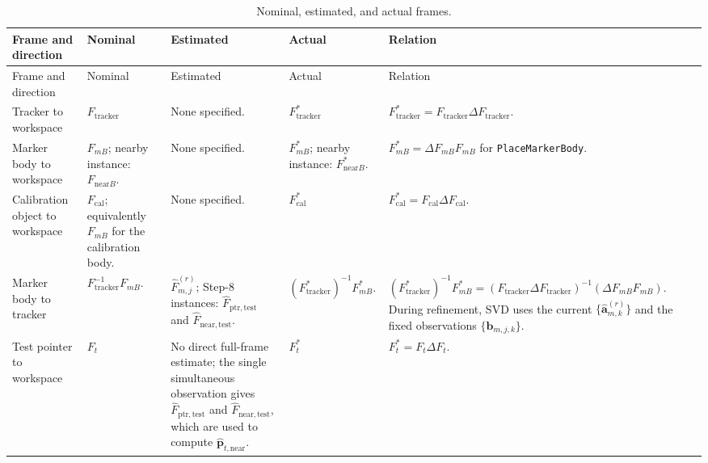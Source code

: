 \documentclass[11pt]{article}
\newcommand{\vct}[1]{\bm{#1}}
\begin{document}
\begingroup\footnotesize
\setlength{\tabcolsep}{3pt}
\begin{longtable}{>{\raggedright\arraybackslash}p{}>{\raggedright\arraybackslash}p{}>{\raggedright\arraybackslash}p{}>{\raggedright\arraybackslash}p{}>{\raggedright\arraybackslash}p{}}
\caption{Nominal, estimated, and actual frames.}\label{tab:frames}\\
\toprule
Frame and direction & Nominal & Estimated & Actual & Relation \\\midrule
\endfirsthead
\toprule Frame and direction & Nominal & Estimated & Actual & Relation \\\midrule
\endhead
Tracker to workspace & $F_{\mathrm{tracker}}$ & None specified. & $F_{\mathrm{tracker}}^*$ & $F_{\mathrm{tracker}}^*=F_{\mathrm{tracker}}\Delta F_{\mathrm{tracker}}$. \\\midrule
Marker body to workspace & $F_{mB}$; nearby instance: $F_{\mathrm{near}B}$. & None specified. & $F_{mB}^*$; nearby instance: $F_{\mathrm{near}B}^*$. & $F_{mB}^*=\Delta F_{mB}F_{mB}$ for \texttt{PlaceMarkerBody}. \\\midrule
Calibration object to workspace & $F_{\mathrm{cal}}$; equivalently $F_{mB}$ for the calibration body. & None specified. & $F_{\mathrm{cal}}^*$ & $F_{\mathrm{cal}}^*=F_{\mathrm{cal}}\Delta F_{\mathrm{cal}}$. \\\midrule
Marker body to tracker & $F_{\mathrm{tracker}}^{-1}F_{mB}$. & $\widehat F_{m,j}^{(r)}$; Step-8 instances: $\widehat F_{\mathrm{ptr},\mathrm{test}}$ and $\widehat F_{\mathrm{near},\mathrm{test}}$. & $(F_{\mathrm{tracker}}^*)^{-1}F_{mB}^*$. & $(F_{\mathrm{tracker}}^*)^{-1}F_{mB}^*=(F_{\mathrm{tracker}}\Delta F_{\mathrm{tracker}})^{-1}(\Delta F_{mB}F_{mB})$. During refinement, SVD uses the current $\{\widehat{\vct{a}}_{m,k}^{(r)}\}$ and the fixed observations $\{\vct{b}_{m,j,k}\}$. \\\midrule
Test pointer to workspace & $F_t$ & No direct full-frame estimate; the single simultaneous observation gives $\widehat F_{\mathrm{ptr},\mathrm{test}}$ and $\widehat F_{\mathrm{near},\mathrm{test}}$, which are used to compute $\widehat{\vct{p}}_{t,\mathrm{near}}$. & $F_t^*$ & $F_t^*=F_t\Delta F_t$. \\
\bottomrule
\end{longtable}
\endgroup
\end{document}
